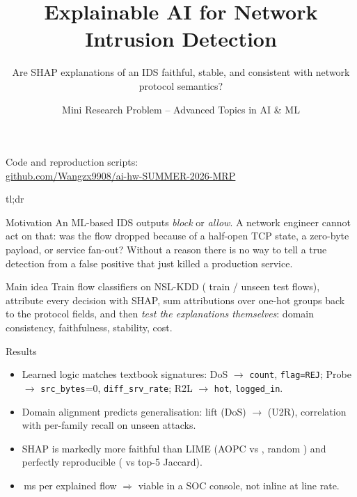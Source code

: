 \documentclass[10pt,aspectratio=169]{beamer}
\title{\bfseries Explainable AI for Network Intrusion Detection}
\subtitle{Are SHAP explanations of an IDS faithful, stable, and consistent with
network protocol semantics?}
\author{Mini Research Problem -- Advanced Topics in AI \& ML}
\date{}
\newcommand{\f}[1]{{\small\texttt{#1}}}
\newcommand{\link}[2]{\href{#1}{\color{accent}\underline{#2}}}
\begin{document}
{
\begin{frame}[plain]
  \titlepage
  \vspace{-1.2em}
  \centering\small
  Code and reproduction scripts:\\
  \link{https://github.com/Wangzx9908/ai-hw-SUMMER-2026-MRP}{github.com/Wangzx9908/ai-hw-SUMMER-2026-MRP}
\end{frame}}

\begin{frame}{tl;dr}
\small
\begin{block}{Motivation}
An ML-based IDS outputs \emph{block} or \emph{allow}. A network engineer cannot
act on that: was the flow dropped because of a half-open TCP state, a zero-byte
payload, or service fan-out? Without a reason there is no way to tell a true
detection from a false positive that just killed a production service.
\end{block}
\vspace{-0.3em}
\begin{block}{Main idea}
Train flow classifiers on NSL-KDD (\nTrain{} train / \nTest{} unseen test
flows), attribute every decision with SHAP, sum attributions over one-hot
groups back to the \nFields{} protocol fields, and then \emph{test the
explanations themselves}: domain consistency, faithfulness, stability, cost.
\end{block}
\vspace{-0.3em}
\begin{block}{Results}
\begin{itemize}\itemsep1pt
  \item Learned logic matches textbook signatures: DoS $\to$ \f{count}, \f{flag=REJ};
        Probe $\to$ \f{src\_bytes}=0, \f{diff\_srv\_rate}; R2L $\to$ \f{hot}, \f{logged\_in}.
  \item Domain alignment predicts generalisation: lift \liftDoS{} (DoS) $\to$ \liftUTR{} (U2R),
        correlation \corrAlign{} with per-family recall on unseen attacks.
  \item SHAP is markedly more faithful than LIME (AOPC \aopcShap{} vs \aopcLime{}, random \aopcRand{})
        and perfectly reproducible (\stabShap{} vs \stabLime{} top-5 Jaccard).
  \item \msTree{}\,ms per explained flow $\Rightarrow$ viable in a SOC console, not inline at line rate.
\end{itemize}
\end{block}
\end{frame}
\end{document}

